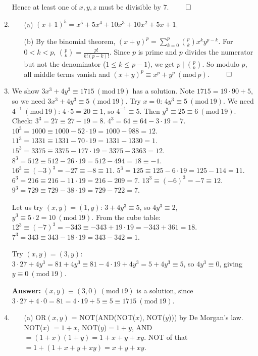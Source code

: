 \documentclass[12pt]{article}
\newcommand{\Mod}[1]{\ (\mathrm{mod}\ #1)}
\begin{document}
\begin{enumerate}
Hence at least one of $x,y,z$ must be divisible by $7$. $\qed$

\item
\begin{enumerate}
  \item[(a)] $(x+1)^5 = x^5 + 5x^4 + 10x^3 + 10x^2 + 5x + 1$.

  \item[(b)] By the binomial theorem, $(x+y)^p = \sum_{k=0}^{p}\binom{p}{k}x^k y^{p-k}$.
  For $0<k<p$, $\binom{p}{k}=\frac{p!}{k!(p-k)!}$. Since $p$ is prime and $p$ divides the numerator but not the denominator ($1\le k\le p-1$), we get $p\mid\binom{p}{k}$.
  So modulo $p$, all middle terms vanish and $(x+y)^p\equiv x^p+y^p\Mod{p}$. $\qed$
\end{enumerate}

\item We show $3x^3+4y^3\equiv 1715\Mod{19}$ has a solution.
Note $1715 = 19\cdot 90 + 5$, so we need $3x^3+4y^3\equiv 5\Mod{19}$.
Try $x=0$: $4y^3\equiv 5\Mod{19}$. We need $4^{-1}\Mod{19}$: $4\cdot 5=20\equiv 1$, so $4^{-1}\equiv 5$.
Then $y^3\equiv 25\equiv 6\Mod{19}$. Check: $3^3=27\equiv 27-19=8$. $4^3=64\equiv 64-3\cdot 19=7$. $10^3=1000\equiv 1000-52\cdot 19=1000-988=12$. $11^3=1331\equiv 1331-70\cdot 19=1331-1330=1$. $15^3=3375\equiv 3375-177\cdot 19=3375-3363=12$. $8^3=512\equiv 512-26\cdot 19=512-494=18\equiv -1$. $16^3\equiv(-3)^3=-27\equiv -8\equiv 11$. $5^3=125\equiv 125-6\cdot 19=125-114=11$. $6^3=216\equiv 216-11\cdot 19=216-209=7$. $13^3\equiv(-6)^3=-7\equiv 12$. $9^3=729\equiv 729-38\cdot 19=729-722=7$.

Let us try $(x,y)=(1,y)$: $3+4y^3\equiv 5$, so $4y^3\equiv 2$, $y^3\equiv 5\cdot 2=10\Mod{19}$. From the cube table: $12^3\equiv(-7)^3=-343\equiv -343+19\cdot 19=-343+361=18$. $7^3=343\equiv 343-18\cdot 19=343-342=1$.

Try $(x,y)=(3,y)$: $3\cdot 27+4y^3=81+4y^3\equiv 81-4\cdot 19+4y^3=5+4y^3\equiv 5$, so $4y^3\equiv 0$, giving $y\equiv 0\Mod{19}$.

\textbf{Answer: }$(x,y)\equiv (3,0)\Mod{19}$ is a solution, since $3\cdot 27+4\cdot 0=81=4\cdot 19+5\equiv 5\equiv 1715\Mod{19}$.

\item
\begin{enumerate}
  \item[(a)] OR$(x,y)$ = NOT(AND(NOT($x$), NOT($y$))) by De Morgan's law.
  NOT($x$) $=1+x$, NOT($y$)$=1+y$, AND $=(1+x)(1+y)=1+x+y+xy$.
  NOT of that $=1+(1+x+y+xy)=x+y+xy$.


\end{enumerate}
\end{enumerate}
\end{document}
